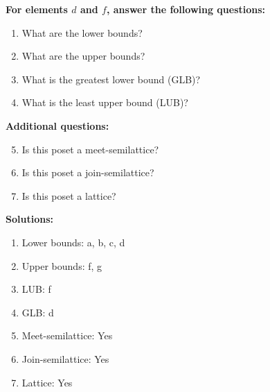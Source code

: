 \documentclass{article}
\begin{document}
    \textbf{For elements $d$ and $f$, answer the following questions:}
\begin{enumerate}
    \item What are the lower bounds?
    \item What are the upper bounds?
    \item What is the greatest lower bound (GLB)?
    \item What is the least upper bound (LUB)?
\end{enumerate}
    \hspace*{3ex} \textbf{Additional questions:}
\begin{enumerate}
    \setcounter{enumi}{4}
    \item Is this poset a meet-semilattice?
    \item Is this poset a join-semilattice?
    \item Is this poset a lattice?
\end{enumerate}

\textbf{Solutions:}
\begin{enumerate}
    \item Lower bounds: {a, b, c, d}
    \item Upper bounds: {f, g}
    \item LUB: f
    \item GLB: d
    \item Meet-semilattice: Yes
    \item Join-semilattice: Yes
    \item Lattice: Yes
\end{enumerate}
\newpage
\end{document}
